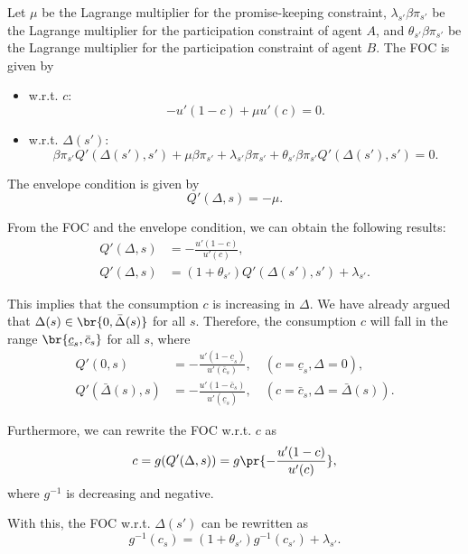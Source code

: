 Let $\mu$ be the Lagrange multiplier for the promise-keeping constraint, $\lambda_{s'}\beta\pi_{s'}$ be the Lagrange multiplier for the participation constraint of agent $A$, and $\theta_{s'}\beta\pi_{s'}$ be the Lagrange multiplier for the participation constraint of agent $B$. The FOC is given by
\begin{itemize}
    \item w.r.t. $c$:
    \[
    -u'(1-c) + \mu u'(c) = 0.
    \]
    \item w.r.t. $\Delta(s')$:
    \[
    \beta\pi_{s'}Q'(\Delta(s'),s') + \mu\beta\pi_{s'} + \lambda_{s'}\beta\pi_{s'} + \theta_{s'}\beta\pi_{s'}Q'(\Delta(s'),s') = 0.
    \]
\end{itemize}

The envelope condition is given by
\[
Q'(\Delta, s) = -\mu.
\]

From the FOC and the envelope condition, we can obtain the following results:
\[
\begin{aligned}
    Q'(\Delta,s) & = -\frac{u'(1-c)}{u'(c)},\\
    Q'(\Delta,s) & = (1+\theta_{s'})Q'(\Delta(s'),s') + \lambda_{s'}.
\end{aligned}
\]

This implies that the consumption $c$ is increasing in $\Delta$. We have already argued that $\Delta(s)\in \br{0,\bar\Delta(s)}$ for all $s$. Therefore, the consumption $c$ will fall in the range $\br{\underline c_s,\bar c_s}$ for all $s$, where
\[
\begin{aligned}
    Q'(0,s) & = -\frac{u'(1-\underline c_s)}{u'(\bar c_s)}, \quad (c = \underline c_s, \Delta = 0),\\
    Q'(\bar\Delta(s),s) & = -\frac{u'(1-\bar c_s)}{u'(\underline c_s)}, \quad (c = \bar c_s, \Delta = \bar\Delta(s)).
\end{aligned}
\]

Furthermore, we can rewrite the FOC w.r.t. $c$ as
\[
c = g(Q'(\Delta,s)) = g\pr{-\frac{u'(1-c)}{u'(c)}},
\]
where $g^{-1}$ is decreasing and negative. 

With this, the FOC w.r.t. $\Delta(s')$ can be rewritten as
\[
g^{-1}(c_s) = (1+\theta_{s'})g^{-1}(c_{s'}) + \lambda_{s'}.
\]

